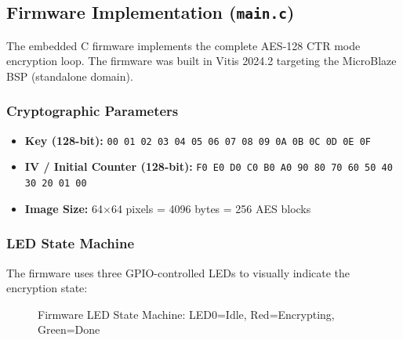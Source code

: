\documentclass[12pt,a4paper]{article}
\begin{document}
\subsection{Firmware Implementation (\texttt{main.c})}

The embedded C firmware implements the complete AES-128 CTR mode encryption loop. The firmware was built in Vitis 2024.2 targeting the MicroBlaze BSP (standalone domain).

\subsubsection{Cryptographic Parameters}

\begin{itemize}[leftmargin=*]
    \item \textbf{Key (128-bit):} \texttt{00 01 02 03 04 05 06 07 08 09 0A 0B 0C 0D 0E 0F}
    \item \textbf{IV / Initial Counter (128-bit):} \texttt{F0 E0 D0 C0 B0 A0 90 80 70 60 50 40 30 20 01 00}
    \item \textbf{Image Size:} 64$\times$64 pixels = 4096 bytes = 256 AES blocks
\end{itemize}

\subsubsection{LED State Machine}

The firmware uses three GPIO-controlled LEDs to visually indicate the encryption state:

\begin{figure}[H]
\centering
{}
\caption{Firmware LED State Machine: LED0=Idle, Red=Encrypting, Green=Done}
\label{fig:led_fsm}
\end{figure}
\end{document}
